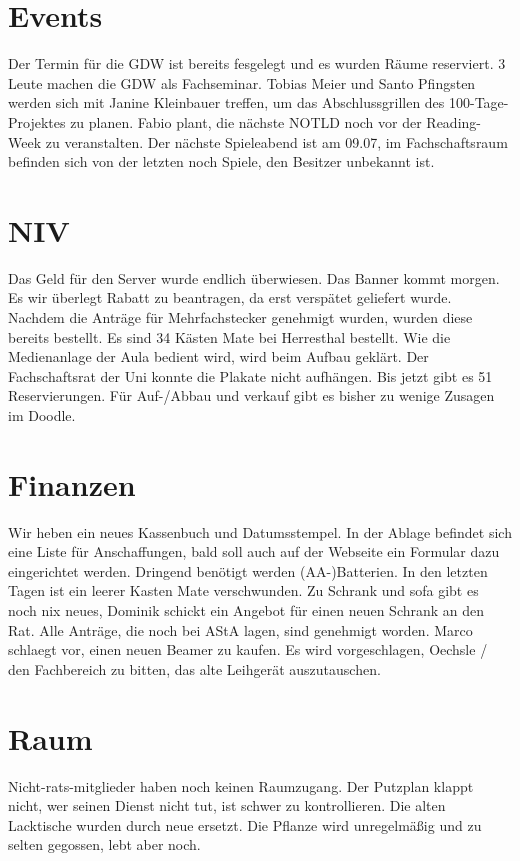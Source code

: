 \documentclass[a4paper, 11pt]{article} %
\begin{document}
\section{Events}
Der Termin für die GDW ist bereits fesgelegt und es wurden Räume reserviert. 3 Leute machen die GDW als Fachseminar.
Tobias Meier und Santo Pfingsten werden sich mit Janine Kleinbauer treffen, um das Abschlussgrillen des 100-Tage-Projektes zu planen.
Fabio plant, die nächste NOTLD noch vor der Reading-Week zu veranstalten.
Der nächste Spieleabend ist am 09.07, im Fachschaftsraum befinden sich von der letzten noch Spiele, den Besitzer unbekannt ist.

\section{NIV}
Das Geld für den Server wurde endlich überwiesen.
Das Banner kommt morgen. Es wir überlegt Rabatt zu beantragen, da erst verspätet geliefert wurde.
Nachdem die Anträge für Mehrfachstecker genehmigt wurden, wurden diese bereits bestellt.
Es sind 34 Kästen Mate bei Herresthal bestellt.
Wie die Medienanlage der Aula bedient wird, wird beim Aufbau geklärt.
Der Fachschaftsrat der Uni konnte die Plakate nicht aufhängen.
Bis jetzt gibt es 51 Reservierungen.
Für Auf-/Abbau und verkauf gibt es bisher zu wenige Zusagen im Doodle.

\section{Finanzen}
Wir heben ein neues Kassenbuch und Datumsstempel. In der Ablage befindet sich eine Liste für Anschaffungen, bald soll auch auf der Webseite ein Formular dazu eingerichtet werden.
Dringend benötigt werden (AA-)Batterien.
In den letzten Tagen ist ein leerer Kasten Mate verschwunden.
Zu Schrank und sofa gibt es noch nix neues, Dominik schickt ein Angebot für einen neuen Schrank an den Rat.
Alle Anträge, die noch bei AStA lagen, sind genehmigt worden.
Marco schlaegt vor, einen neuen Beamer zu kaufen. Es wird vorgeschlagen, Oechsle / den Fachbereich zu bitten, das alte Leihgerät auszutauschen.

\section{Raum}
Nicht-rats-mitglieder haben noch keinen Raumzugang.
Der Putzplan klappt nicht, wer seinen Dienst nicht tut, ist schwer zu kontrollieren.
Die alten Lacktische wurden durch neue ersetzt.
Die Pflanze wird unregelmäßig und zu selten gegossen, lebt aber noch.
\end{document}
